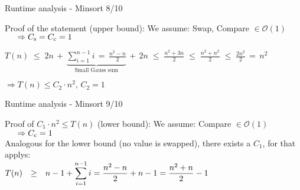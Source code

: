 
\begin{frame}{Runtime analysis - Minsort 8/10}
  \begin{block}{Proof of the statement ({\color{Mittel-Gruen}upper bound}):}
    We assume: Swap, Compare $\in \mathcal{O}(1)$\\
    $\hspace{1.5em}\Rightarrow C_\text{s} = C_\text{c} = 1$
    \vspace*{0.5em}
    \begin{center}
      $\displaystyle
      T(n)
      \;\leq\;
        2 n \, + \, \underbrace{
          \sum \limits^{n - 1}_{i = 1} i
          \,=\, \frac{n^2 - n}{2}
        }_\text{Small Gauss sum}
        \, + \,2  n
      \;\leq\; \frac{n^2 + 3 n}{2}
      \;\leq\; \frac{n^2 + n^2}{2}
      \;\leq\; \frac{2 n^2}{2}
      \,=\, n^2
      $
    \end{center}
    $\Rightarrow T(n) \leq C_2 \cdot n^2, \, C_2 = 1$
  \end{block}
\end{frame}


\begin{frame}{Runtime analysis - Minsort 9/10}
  \begin{block}{Proof of $C_1 \cdot n^2 \leq T(n)$ ({\color{Mittel-Gruen}lower 
  bound}):}
    We assume: Compare $\in \mathcal{O}(1)$\\
    $\hspace{1.5em}\Rightarrow C_\text{c} = 1$\\
    \vspace*{0.5em}
    Analogous for the {\color{Mittel-Gruen}lower bound}
    (no value is swapped), there exists a $C_1$, for that
    applys:\\[0.5em]
    \centering
    $\begin{array}{@{}rcl@{}}
      T(n) & \geq &
      \displaystyle
      n - 1 + \sum^{n - 1}_{i=1} i
      = \frac{n^2 - n}{2} + n - 1
      = \frac{n^2 + n}{2} - 1
    \end{array}$
  \end{block}
\end{frame}


